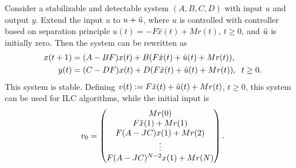 \begin{exam}
\label{ex:ILC:LQR}
Consider a stabilizable and detectable system $(A,B,C,D)$ with input $u$ and output $y$. 
Extend the input $u$ to $u + \tilde{u}$, where $u$ is controlled with controller based on separation principle $u(t) = -F \hat x(t) + M r(t)$, $t \geq 0$, and $\tilde{u}$ is initially zero. Then the system can be rewritten as
\begin{align}
x(t+1) & = (A - BF)x(t) + B(F \tilde{x}(t) + \tilde{u}(t) + M r(t)), \\
y(t) & = (C - DF)x(t) + D(F \tilde{x}(t) + \tilde{u}(t) + M r(t)), \;\; t \geq 0.
\end{align}
This system is stable. Defining $v(t):=F \tilde{x}(t) + \tilde{u}(t) + M r(t)$, $t \geq 0$, this system can be used for ILC algorithms, while the initial input is 
\begin{align}
v_0 = \begin{pmatrix}
M r(0) \\ F \tilde{x}(1) + M r(1) \\ F (A - JC) x(1) + M r(2)\\ \vdots \\ F(A - JC)^{N-2} x(1) + M r(N)
\end{pmatrix}.
\end{align}
\end{exam}


